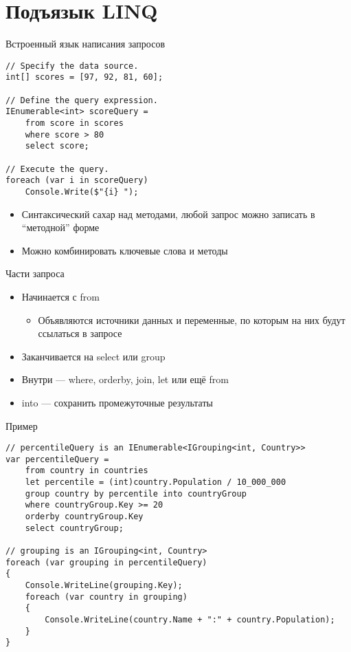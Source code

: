 \documentclass{../../slides-style}
\begin{document}
    \section{Подъязык LINQ}

    \begin{frame}[fragile]{Встроенный язык написания запросов}
        \begin{verbatim}
// Specify the data source.
int[] scores = [97, 92, 81, 60];

// Define the query expression.
IEnumerable<int> scoreQuery =
    from score in scores
    where score > 80
    select score;

// Execute the query.
foreach (var i in scoreQuery)
    Console.Write($"{i} ");
        \end{verbatim}
        \begin{itemize}
            \item Синтаксический сахар над методами, любой запрос можно записать в \enquote{методной} форме
            \item Можно комбинировать ключевые слова и методы
        \end{itemize}
    \end{frame}

    \begin{frame}{Части запроса}
        \begin{itemize}
            \item Начинается с from
            \begin{itemize}
                \item Объявляются источники данных и переменные, по которым на них будут ссылаться в запросе
            \end{itemize}
            \item Заканчивается на select или group
            \item Внутри --- where, orderby, join, let или ещё from
            \item into --- сохранить промежуточные результаты
        \end{itemize}
    \end{frame}

    \begin{frame}[fragile]{Пример}
        \begin{small}
            \begin{verbatim}
// percentileQuery is an IEnumerable<IGrouping<int, Country>>
var percentileQuery =
    from country in countries
    let percentile = (int)country.Population / 10_000_000
    group country by percentile into countryGroup
    where countryGroup.Key >= 20
    orderby countryGroup.Key
    select countryGroup;

// grouping is an IGrouping<int, Country>
foreach (var grouping in percentileQuery)
{
    Console.WriteLine(grouping.Key);
    foreach (var country in grouping)
    {
        Console.WriteLine(country.Name + ":" + country.Population);
    }
}
            \end{verbatim}
        \end{small}
    \end{frame}
\end{document}
